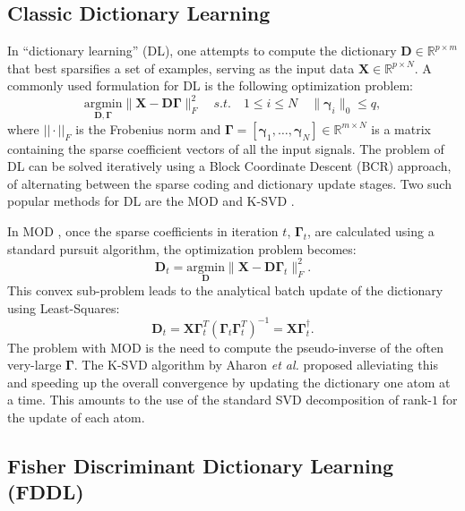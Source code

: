 \documentclass[journal]{IEEEtran}
\newcommand{\bD}{\mathbf{D}}
\newcommand{\bX}{\mathbf{X}}
\newcommand{\bGamma}{\boldsymbol{\Gamma}}
\newcommand{\bgamma}{\boldsymbol{\gamma}}
\begin{document}
\subsection{Classic Dictionary Learning} \label{SS:classicDL}

In ``dictionary learning'' (DL), one attempts to compute the dictionary $\bD \in \mathbb{R}^{p \times m}$ that best sparsifies a set of examples, serving as the input data $\bX \in \mathbb{R}^{p \times N}$. A commonly used formulation for DL is the following optimization problem:
\begin{equation}\label{eq:DictionaryLearning}
    \underset{\bD,\bGamma}{\text{argmin}} \| \bX - \bD \bGamma \|_F^2 \quad s.t. \quad 1 \le i\le N \quad
    \| \bgamma_i \|_0   \leq  \mathit{q},
\end{equation}
where $||\cdot||_F$ is the Frobenius norm and $\bGamma = \left[\bgamma_1,\ldots,\bgamma_N\right] \in \mathbb{R}^{m \times N}$ is a matrix containing the sparse coefficient vectors of all the input signals. The problem of DL can be solved iteratively using a Block Coordinate Descent (BCR) approach, of alternating between the sparse coding and dictionary update stages. Two such popular methods for DL are the MOD \cite{MOD} and K-SVD \cite{KSVD}.

In MOD \cite{MOD}, once the sparse coefficients in iteration $t$, $\bGamma_t$, are calculated using a standard pursuit algorithm, the optimization problem becomes:
\begin{equation}\label{eq:MOD1}
\bD_{t}=\underset{\bD}{\text{argmin}} \| \bX - \bD \bGamma_t \|_F^2.
\end{equation}
This convex sub-problem leads to the analytical batch update of the dictionary using Least-Squares:
\begin{equation}\label{eq:MOD2}
\bD_{t} = \bX \bGamma_t^T (\bGamma_t \bGamma_t^T)^{-1} = \bX \bGamma_t^{\dagger}.
\end{equation}
The problem with MOD is the need to compute the pseudo-inverse of the often very-large $\bGamma$. The K-SVD algorithm by Aharon \textit{et al.} \cite{KSVD} proposed alleviating this and speeding up the overall convergence by updating the dictionary one atom at a time.
This amounts to the use of the standard SVD decomposition of rank-$1$ for the update of each atom.

\subsection{Fisher Discriminant Dictionary Learning (FDDL)}
\end{document}
